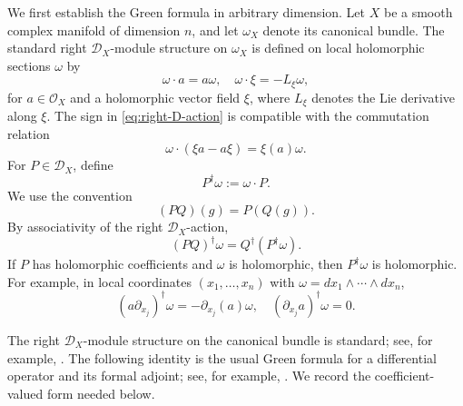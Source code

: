 \documentclass[12pt]{amsart}
\numberwithin{equation}{section}
\theoremstyle{plain}
\theoremstyle{definition}
\theoremstyle{remark}
\theoremstyle{definition}
\newcommand{\D}{\mathscr D}
\begin{document}

We first establish the Green formula in arbitrary dimension. Let $X$ be a smooth complex manifold of dimension $n$, and let $\omega_X$ denote its canonical bundle. The standard right $\D_X$-module structure on $\omega_X$ is defined on local holomorphic sections $\omega$ by
\begin{equation}\label{eq:right-D-action}
\omega\mathbin{\cdot}a=a\omega,\quad \omega\mathbin{\cdot}\xi=-L_\xi\omega,
\end{equation}
for $a\in\mathcal O_X$ and a holomorphic vector field $\xi$, where $L_\xi$ denotes the Lie derivative along $\xi$. The sign in \eqref{eq:right-D-action} is compatible with the commutation relation
\begin{equation*}
\omega\mathbin{\cdot}(\xi a-a\xi)=\xi(a)\omega.
\end{equation*}
For $P\in\D_X$, define
\begin{equation}\label{eq:dagger-definition}
P^\dagger\omega:=\omega\mathbin{\cdot}P.
\end{equation}
We use the convention
\begin{equation*}
(PQ)(g)=P(Q(g)).
\end{equation*}
By associativity of the right $\D_X$-action,
\begin{equation}\label{eq:dagger-composition}
(PQ)^\dagger\omega=Q^\dagger(P^\dagger\omega).
\end{equation}
If $P$ has holomorphic coefficients and $\omega$ is holomorphic, then $P^\dagger\omega$ is holomorphic. For example, in local coordinates $(x_1,\ldots,x_n)$ with $\omega=dx_1\wedge\cdots\wedge dx_n$,
\begin{equation*}
(a\partial_{x_j})^\dagger\omega=-\partial_{x_j}(a)\omega,\quad (\partial_{x_j}a)^\dagger\omega=0.
\end{equation*}



The right $\D_X$-module structure on the canonical bundle is standard; see, for example, \cite{HottaTakeuchiTanisaki2008}. The following identity is the usual Green formula for a differential operator and its formal adjoint; see, for example, \cite[Chapter~2]{LionsMagenes1972}. We record the coefficient-valued form needed below.
\end{document}
